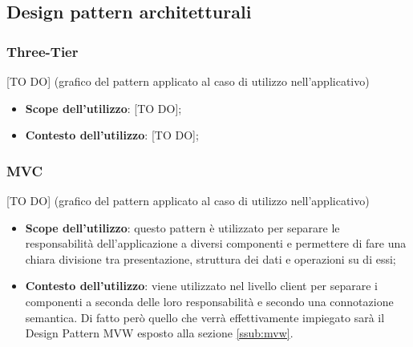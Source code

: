 %


\subsection{Design pattern architetturali} %
\label{sub:design_pattern_architetturali}
	\subsubsection{Three-Tier} %
	\label{ssub:three_tier}
	[TO DO] (grafico del pattern applicato al caso di utilizzo nell'applicativo)
		\begin{itemize}
			\item \textbf{Scope dell'utilizzo}: [TO DO];
			\item \textbf{Contesto dell'utilizzo}: [TO DO];
		\end{itemize}

	\subsubsection{MVC} %
	\label{ssub:mvc}
	[TO DO] (grafico del pattern applicato al caso di utilizzo nell'applicativo)
		\begin{itemize}
			\item \textbf{Scope dell'utilizzo}: questo pattern è utilizzato per separare le responsabilità dell’applicazione a diversi componenti e permettere di fare una chiara divisione tra presentazione, struttura dei dati e operazioni su di essi;
			\item \textbf{Contesto dell'utilizzo}: viene utilizzato nel livello client per separare i componenti a seconda delle loro responsabilità e secondo una connotazione semantica. Di fatto però quello che verrà effettivamente impiegato sarà il Design Pattern MVW esposto alla sezione \ref{ssub:mvw}.
		\end{itemize}

